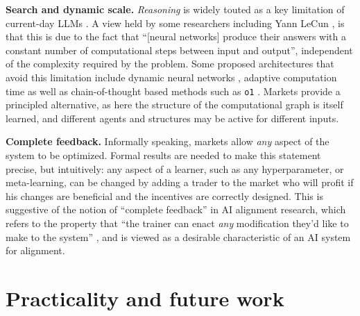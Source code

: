 \textbf{Search and dynamic scale.} \emph{Reasoning} is widely touted as a key limitation of current-day LLMs \citep{huangReasoningLargeLanguage2023,mclauAISearchBitterer2024}. A view held by some researchers including Yann LeCun \citep{yannlecunMachinesThatCan2023}, is that this is due to the fact that ``[neural networks] produce their answers with a constant number of computational steps between input and output'', independent of the complexity required by the problem. Some proposed architectures that avoid this limitation include dynamic neural networks \citep{hanDynamicNeuralNetworks2021}, adaptive computation time \citep{gravesAdaptiveComputationTime2017} as well as chain-of-thought based methods such as \texttt{o1} \citep{openaiLearningReasonLLMs2024}. Markets provide a principled alternative, as here the structure of the computational graph is itself learned, and different agents and structures may be active for different inputs.



\textbf{Complete feedback.} Informally speaking, markets allow \emph{any} aspect of the system to be optimized. Formal results are needed to make this statement precise, but intuitively: any aspect of a learner, such as any hyperparameter, or meta-learning, can be changed by adding a trader to the market who will profit if his changes are beneficial and the incentives are correctly designed. This is suggestive of the notion of ``complete feedback'' in AI alignment research, which refers to the property that ``the trainer can enact \emph{any} modification they'd like to make to the system'' \citep{demskiCompleteFeedback2024}, and is viewed as a desirable characteristic of an AI system for alignment. %

\section{Practicality and future work}

